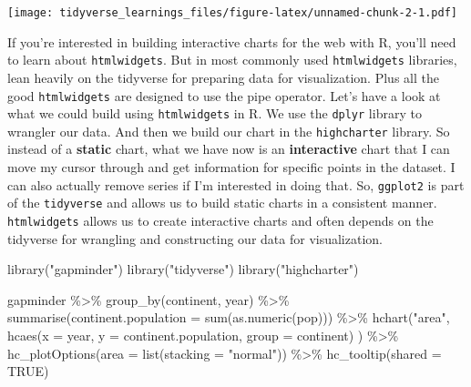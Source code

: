 \documentclass[
]{article}
\newenvironment{Shaded}{\begin{snugshade}}{\end{snugshade}}
\newcommand{\AttributeTok}[1]{\textcolor[rgb]{0.77,0.63,0.00}{#1}}
\newcommand{\ConstantTok}[1]{\textcolor[rgb]{0.00,0.00,0.00}{#1}}
\newcommand{\FunctionTok}[1]{\textcolor[rgb]{0.00,0.00,0.00}{#1}}
\newcommand{\NormalTok}[1]{#1}
\newcommand{\SpecialCharTok}[1]{\textcolor[rgb]{0.00,0.00,0.00}{#1}}
\newcommand{\StringTok}[1]{\textcolor[rgb]{0.31,0.60,0.02}{#1}}
\begin{document}
\texttt{[image: tidyverse\_learnings\_files/figure-latex/unnamed-chunk-2-1.pdf]}

If you're interested in building interactive charts for the web with R, you'll need to learn about \texttt{htmlwidgets}. But in most commonly used \texttt{htmlwidgets} libraries, lean heavily on the tidyverse for preparing data for visualization. Plus all the good \texttt{htmlwidgets} are designed to use the pipe operator. Let's have a look at what we could build using \texttt{htmlwidgets} in R. We use the \texttt{dplyr} library to wrangler our data. And then we build our chart in the \texttt{highcharter} library. So instead of a \textbf{static} chart, what we have now is an \textbf{interactive} chart that I can move my cursor through and get information for specific points in the dataset. I can also actually remove series if I'm interested in doing that. So, \texttt{ggplot2} is part of the \texttt{tidyverse} and allows us to build static charts in a consistent manner. \texttt{htmlwidgets} allows us to create interactive charts and often depends on the tidyverse for wrangling and constructing our data for visualization.

\begin{Shaded}
\begin{Highlighting}[]
\FunctionTok{library}\NormalTok{(}\StringTok{"gapminder"}\NormalTok{)}
\FunctionTok{library}\NormalTok{(}\StringTok{"tidyverse"}\NormalTok{)}
\FunctionTok{library}\NormalTok{(}\StringTok{"highcharter"}\NormalTok{)}

\NormalTok{gapminder }\SpecialCharTok{\%\textgreater{}\%}
  \FunctionTok{group\_by}\NormalTok{(continent, year) }\SpecialCharTok{\%\textgreater{}\%}
  \FunctionTok{summarise}\NormalTok{(}\AttributeTok{continent.population =} \FunctionTok{sum}\NormalTok{(}\FunctionTok{as.numeric}\NormalTok{(pop))) }\SpecialCharTok{\%\textgreater{}\%}
  \FunctionTok{hchart}\NormalTok{(}\StringTok{"area"}\NormalTok{,}
         \FunctionTok{hcaes}\NormalTok{(}\AttributeTok{x =}\NormalTok{ year, }
               \AttributeTok{y =}\NormalTok{ continent.population, }
               \AttributeTok{group =}\NormalTok{ continent)}
\NormalTok{         ) }\SpecialCharTok{\%\textgreater{}\%}
  \FunctionTok{hc\_plotOptions}\NormalTok{(}\AttributeTok{area =} \FunctionTok{list}\NormalTok{(}\AttributeTok{stacking =} \StringTok{"normal"}\NormalTok{)) }\SpecialCharTok{\%\textgreater{}\%}
  \FunctionTok{hc\_tooltip}\NormalTok{(}\AttributeTok{shared =} \ConstantTok{TRUE}\NormalTok{)}
\end{Highlighting}
\end{Shaded}
\end{document}
